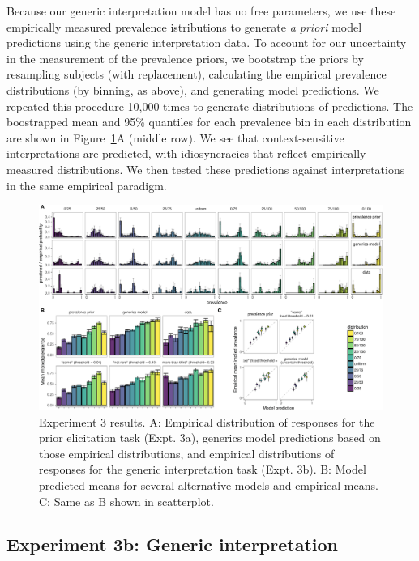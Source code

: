 \documentclass[floatsintext,man]{apa6}
\theoremstyle{definition}
\theoremstyle{definition}
\theoremstyle{definition}
\theoremstyle{remark}
\begin{document}
Because our generic interpretation model has no free parameters, we use
these empirically measured prevalence istributions to generate \emph{a
priori} model predictions using the generic interpretation data. To
account for our uncertainty in the measurement of the prevalence priors,
we bootstrap the priors by resampling subjects (with replacement),
calculating the empirical prevalence distributions (by binning, as
above), and generating model predictions. We repeated this procedure
10,000 times to generate distributions of predictions. The boostrapped
mean and 95\% quantiles for each prevalence bin in each distribution are
shown in Figure~\ref{fig:priorManipulationResults}A (middle row). We see
that context-sensitive interpretations are predicted, with
idiosyncracies that reflect empirically measured distributions. We then
tested these predictions against interpretations in the same empirical
paradigm.

\begin{figure}
\centering
\includegraphics{genint_files/figure-latex/priorManipulationResults-1.pdf}
\caption{\label{fig:priorManipulationResults}Experiment 3 results. A:
Empirical distribution of responses for the prior elicitation task
(Expt. 3a), generics model predictions based on those empirical
distributions, and empirical distributions of responses for the generic
interpretation task (Expt. 3b). B: Model predicted means for several
alternative models and empirical means. C: Same as B shown in
scatterplot.}
\end{figure}

\subsection{Experiment 3b: Generic
interpretation}\label{experiment-3b-generic-interpretation}
\end{document}
